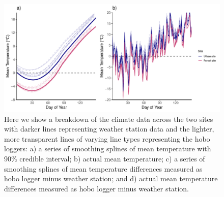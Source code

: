 \documentclass{article}\usepackage[]{graphicx}\usepackage[]{color}
\begin{document}
{\begin{figure} [H]
  \begin{center}
  \includegraphics[width=16cm]{..//analyses/figures/climate_smooth&daily.pdf}
  \caption{Here we show a breakdown of the climate data across the two sites with darker lines representing weather station data and the lighter, more transparent lines of varying line types representing the hobo loggers: a) a series of smoothing splines of mean temperature with 90\% credible interval; b) actual mean temperature; c) a series of smoothing splines of mean temperature differences measured as hobo logger minus weather station; and d) actual mean temperature differences measured as hobo logger minus weather station.}\label{fig:clim}
  \end{center}
  \end{figure}}
  
\end{document}
